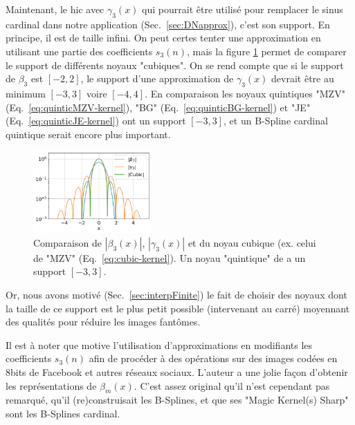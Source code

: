 \documentclass[11pt,twoside]{article}
\begin{document}
Maintenant, le hic avec $\gamma_3(x)$ qui pourrait être utilisé pour remplacer le sinus cardinal dans notre application (Sec.~\ref{sec:DNapprox}), c'est son support. En principe, il est de taille infini. On peut certes tenter une approximation en utilisant une partie des coefficients $s_3(n)$, mais la figure \ref{fig-cubic-kernels-x-support} permet de comparer le support de différents noyaux "cubiques". On se rend compte que si le support de $\beta_3$ est $[-2,2]$, le support d'une approximation  de $\gamma_3(x)$ devrait être au minimum $[-3,3]$ voire $[-4,4]$. En comparaison les noyaux quintiques "MZV" (Eq.~\ref{eq:quinticMZV-kernel}), "BG" (Eq.~\ref{eq:quinticBG-kernel}) et "JE" (Eq.~\ref{eq:quinticJE-kernel}) ont un support $[-3,3]$, et un B-Spline cardinal quintique serait encore plus important. 
\begin{figure}
\centering
\includegraphics[width=0.4\textwidth]{fig11.png}
\caption{Comparaison de $|\beta_3(x)|$, $|\gamma_3(x)|$ et du noyau cubique (ex. celui de "MZV" (Eq.~\ref{eq:cubic-kernel}). Un noyau "quintique" de a un support $[-3,3]$.}
\label{fig-cubic-kernels-x-support}
\end{figure}
Or, nous avons motivé (Sec.~\ref{sec:interpFinite}) le fait de choisir des noyaux dont la taille de ce support est le plus petit possible (intervenant au carré) moyennant des qualités pour réduire les images fantômes.  

Il est à noter que \cite{Costella2021} motive l'utilisation d'approximations en modifiants les coefficients $s_3(n)$ afin de procéder à des opérations sur des images codées en 8bits de Facebook et autres réseaux sociaux. L'auteur a une jolie façon d'obtenir les représentations de  $\beta_m(x)$. C'est assez original qu'il n'est cependant pas remarqué, qu'il (re)construisait les B-Splines, et que ses "Magic Kernel(s) Sharp" sont les B-Splines cardinal.
%
\end{document}

